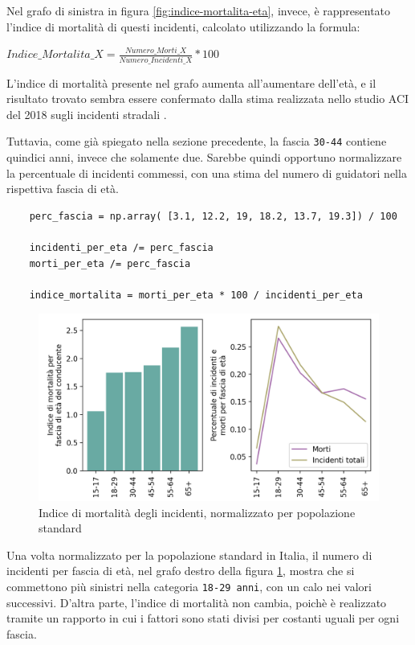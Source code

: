 \documentclass[a4paper,12pt]{report}
\newcommand{\columnstyle}[1]{\texttt{#1}}
\begin{document}
Nel grafo di sinistra in figura \ref{fig:indice-mortalita-eta}, invece, 
è rappresentato l'indice di mortalità di questi incidenti, 
calcolato utilizzando la formula: 

\begin{center}
    $Indice\_Mortalita\_X = \displaystyle \frac{Numero\_Morti\_X}{Numero\_Incidenti\_X} * 100$ 
\end{center}

L'indice di mortalità presente nel grafo aumenta all'aumentare dell'età, 
e il risultato trovato sembra essere confermato dalla stima realizzata nello studio 
ACI del 2018 sugli incidenti stradali \cite{ACI:3}. 

Tuttavia, come già spiegato nella sezione precedente, la fascia \columnstyle{30-44} 
contiene quindici anni, invece che solamente due. Sarebbe quindi opportuno 
normalizzare la percentuale di incidenti commessi, con una stima del numero di 
guidatori nella rispettiva fascia di età.

\begin{lstlisting}
    perc_fascia = np.array( [3.1, 12.2, 19, 18.2, 13.7, 19.3]) / 100

    incidenti_per_eta /= perc_fascia
    morti_per_eta /= perc_fascia

    indice_mortalita = morti_per_eta * 100 / incidenti_per_eta
\end{lstlisting}

\begin{figure}
    \includegraphics[width=\linewidth]{../src/incidenti/incidenti_senza_coords/mortalita/indice_mort_norm.png}
    \caption{Indice di mortalità degli incidenti, normalizzato per popolazione standard}
    \label{fig:indice-mort-norm}
\end{figure}

Una volta normalizzato per la popolazione standard in Italia, il numero di incidenti per 
fascia di età, nel grafo destro della figura \ref{fig:indice-mort-norm}, mostra che  
si commettono più sinistri nella categoria \columnstyle{18-29 anni}, 
con un calo nei valori successivi.
D'altra parte, l'indice di mortalità non cambia, poichè è realizzato tramite 
un rapporto in cui i fattori sono stati divisi per costanti uguali per ogni fascia.
\end{document}
